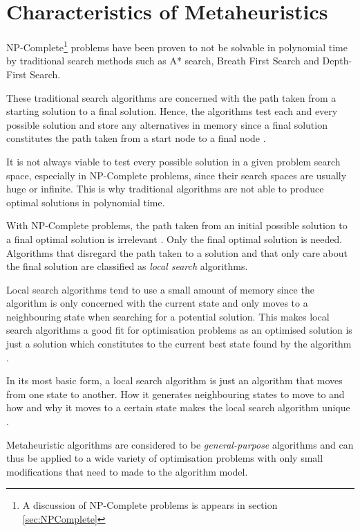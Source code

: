 \section{Characteristics of Metaheuristics}
NP-Complete\footnote{A discussion of NP-Complete problems is appears in section \ref{sec:NPComplete}} problems have been proven to not be solvable in polynomial time by traditional search methods such as A* search, Breath First Search and Depth-First Search\cite{AIModernApproach}. 

These traditional search algorithms are concerned with the path taken from a starting solution to a final solution. Hence, the algorithms test each and every possible solution and store any alternatives in memory since a final solution constitutes the path taken from a start node to a final node \cite{AIModernApproach}.

It is not always viable to test every possible solution in a given problem search space, especially in NP-Complete problems, since their search spaces are usually huge or infinite. This is why traditional algorithms are not able to produce optimal solutions in polynomial time\cite{AIModernApproach}.

With NP-Complete problems, the path taken from an initial possible solution to a final optimal solution is irrelevant \cite{AIModernApproach}. Only the final optimal solution is needed. Algorithms that disregard the path taken to a solution and that only care about the final solution are classified as \emph{local search} algorithms\cite{AIModernApproach}.

Local search algorithms tend to use a small amount of memory since the algorithm is only concerned with the current state and only moves to a neighbouring state when searching for a potential solution. This makes local search algorithms a good fit for optimisation problems as an optimised solution is just a solution which constitutes to the current best state found by the algorithm \cite{AIModernApproach,NonlinearGlobalTabu}. 

In its most basic form, a local search algorithm is just an algorithm that moves from one state to another. How it generates neighbouring states to move to and how and why it moves to a certain state makes the local search algorithm unique \cite{AIModernApproach,CompuIntelligenceIntro,NonlinearGlobalTabu}.

Metaheuristic algorithms are considered to be \emph{general-purpose} algorithms and can thus be applied to a wide variety of optimisation problems with only small modifications that need to made to the algorithm model\cite{MetaGraph}.

